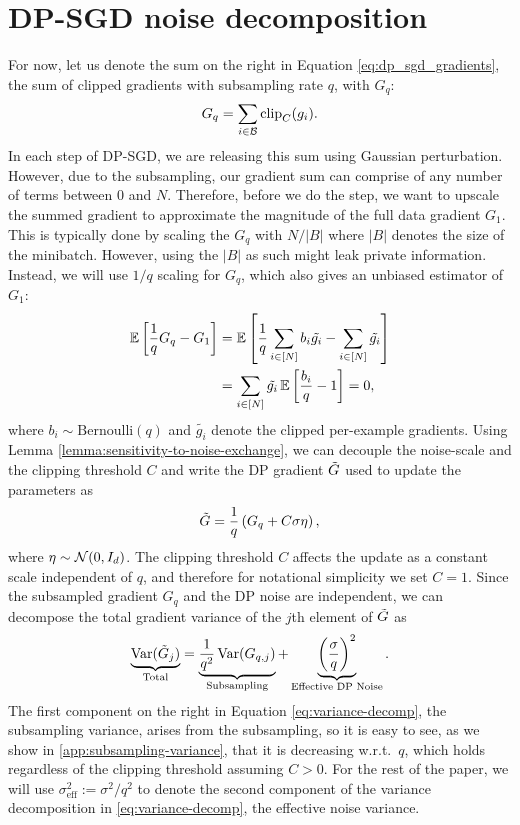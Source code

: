 \documentclass{article}
\theoremstyle{plain}
\theoremstyle{definition}
\theoremstyle{remark}
\begin{document}
\section{DP-SGD noise decomposition}
\label{sec:noise-decomposition}
For now, let us denote the sum on the right in Equation \eqref{eq:dp_sgd_gradients},
the sum of clipped gradients with subsampling rate $q$, with $G_q$:
\begin{align}
    G_q = 
        \sum_{i\in \mathcal{B}}\mathrm{clip}_C(g_i).
\end{align}
In each step of DP-SGD, we are releasing this sum using Gaussian perturbation.
However, due to the subsampling, our gradient sum can comprise of any number of terms between
$0$ and $N$. Therefore, before we do the step, we want to upscale the summed
gradient to approximate the magnitude of the full data gradient $G_1$. This is
typically done by scaling the $G_q$ with $N/|B|$ where $|B|$ denotes the size of
the minibatch. However, using the $|B|$ as such might leak private information.
Instead, we will use $1/q$ scaling for $G_q$, which also gives an unbiased
estimator of $G_1$:
\begin{align}
    \operatorname{\mathbb{E}} \left[ \frac{1}{q}G_q - G_1 \right] 
        &= \operatorname{\mathbb{E}} \left[ \frac{1}{q}\sum_{i \in [N]}b_i \tilde{g_i} - \sum_{i \in [N]} \tilde{g_i} \right] \\
        & = \sum_{i \in [N]} \tilde{g_i} \operatorname{\mathbb{E}} \left[ \frac{b_i}{q} - 1 \right] = 0,
\end{align}
where $b_i \sim \mathrm{Bernoulli}(q)$ and $\tilde{g_i}$ denote the clipped per-example gradients.
Using Lemma \ref{lemma:sensitivity-to-noise-exchange}, we can decouple the
noise-scale and the clipping threshold $C$ and write the DP gradient $\tilde{G}$ used to
update the parameters as
\begin{align}
    \label{eq:unbiased-grad}
    \tilde{G} = \frac{1}{q} \left( G_q + C \sigma \eta\right),
\end{align}
where $\eta \sim \mathcal{N}(0, I_d)$. The clipping threshold $C$ affects
the update as a constant scale independent of $q$, and therefore
for notational simplicity we set $C=1$. Since the subsampled 
gradient $G_q$ and the DP noise are independent, we can decompose the total gradient variance 
of the $j$th element of $\tilde{G}$ as 
\begin{align}
    \label{eq:variance-decomp}
    \underbrace{\operatorname{Var}(\tilde{G}_j)}_{\text{Total}} 
    = \underbrace{\frac{1}{q^2} \operatorname{Var}(G_{q, j})}_{\text{Subsampling}} 
    + \underbrace{\left(\frac{\sigma}{q}\right)^2}_{\text{Effective DP Noise}}.
\end{align}
The first component on the right in Equation \eqref{eq:variance-decomp}, the
subsampling variance, arises from the subsampling, so it is easy to see, as we
show in \cref{app:subsampling-variance}, that it is decreasing w.r.t.\ $q$,
which holds regardless of the clipping threshold assuming $C > 0$. For the rest
of the paper, we will use $\sigma_{\text{eff}}^2 := \sigma^2 / q^2$ to denote
the second component of the variance decomposition in \cref{eq:variance-decomp},
the effective noise variance.
\end{document}
